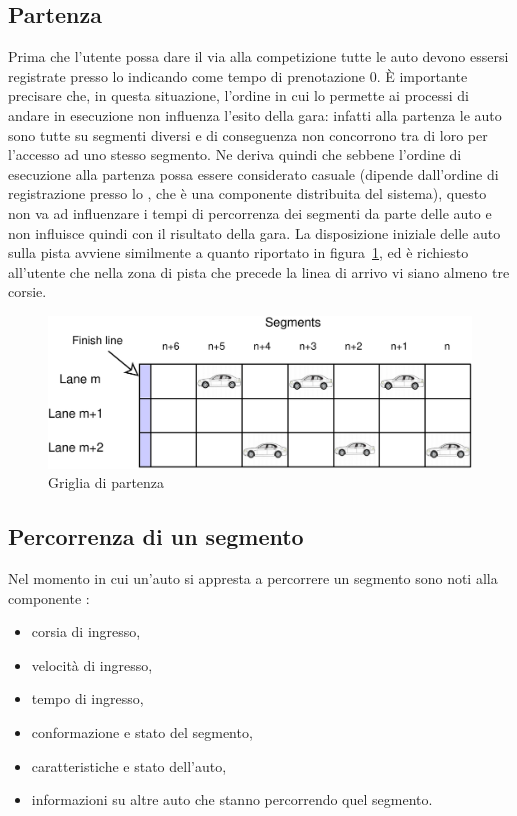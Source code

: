 \subsection{Partenza}
\label{sec:partenza}
Prima che l'utente possa dare il via alla competizione tutte le auto devono essersi registrate presso lo \sched{} indicando come tempo di prenotazione $0$. \`E importante precisare che, in questa situazione, l'ordine in cui lo \sched{} permette ai processi \car{} di andare in esecuzione non influenza l'esito della gara: infatti alla partenza le auto sono tutte su segmenti diversi e di conseguenza non concorrono tra di loro per l'accesso ad uno stesso segmento. Ne deriva quindi che sebbene l'ordine di esecuzione alla partenza possa essere considerato casuale (dipende dall'ordine di registrazione presso lo \sched{}, che è una componente distribuita del sistema), questo non va ad influenzare i tempi di percorrenza dei segmenti da parte delle auto e non influisce quindi con il risultato della gara.
La disposizione iniziale delle auto sulla pista avviene similmente a quanto riportato in figura~\ref{fig:startGrid}, ed è richiesto all'utente che nella zona di pista che precede la linea di arrivo vi siano almeno tre corsie.

\begin{figure}
\includegraphics[width=\textwidth]{diagrammi/StartGrid}
\caption{Griglia di partenza}
\label{fig:startGrid}
\end{figure}

\subsection{Percorrenza di un segmento}
\label{sec:percorrenza}
Nel momento in cui un'auto si appresta a percorrere un segmento sono noti alla componente :
\begin{itemize}
\item corsia di ingresso,
\item velocità di ingresso,
\item tempo di ingresso,
\item conformazione e stato del segmento,
\item caratteristiche e stato dell'auto,
\item informazioni su altre auto che stanno percorrendo quel segmento.
\end{itemize}

